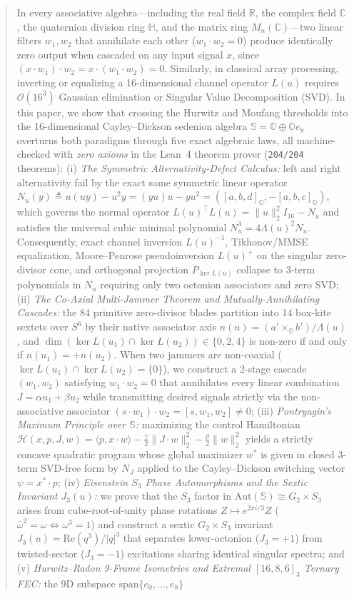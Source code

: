 \documentclass[journal,twoside]{IEEEtran}
\theoremstyle{definition}
\theoremstyle{remark}
\newcommand{\R}{\mathbb{R}}
\newcommand{\C}{\mathbb{C}}
\newcommand{\Ha}{\mathbb{H}}
\newcommand{\Oc}{\mathbb{O}}
\newcommand{\Se}{\mathbb{S}}
\newcommand{\RePart}{\mathrm{Re}}
\newcommand{\Aut}{\mathrm{Aut}}
\begin{document}
\begin{abstract}
In every associative algebra---including the real field $\R$, the complex field $\C$, the quaternion division ring $\Ha$, and the matrix ring $M_n(\C)$---two linear filters $w_1, w_2$ that annihilate each other ($w_1 \cdot w_2 = 0$) produce identically zero output when cascaded on any input signal $x$, since $(x \cdot w_1)\cdot w_2 = x \cdot (w_1 \cdot w_2) = 0$. Similarly, in classical array processing, inverting or equalizing a 16-dimensional channel operator $L(u)$ requires $\mathcal{O}(16^3)$ Gaussian elimination or Singular Value Decomposition (SVD). In this paper, we show that crossing the Hurwitz and Moufang thresholds into the 16-dimensional Cayley--Dickson sedenion algebra $\Se = \Oc \oplus \Oc e_8$ overturns both paradigms through five exact algebraic laws, all machine-checked with \emph{zero axioms} in the Lean~4 theorem prover (\texttt{204/204} theorems): (i) \emph{The Symmetric Alternativity-Defect Calculus:} left and right alternativity fail by the exact same symmetric linear operator $N_u(y) \triangleq u(uy) - u^2 y = (yu)u - y u^2 = ([a,b,d]_{\Oc}, -[a,b,c]_{\Oc})$, which governs the normal operator $L(u)^\top L(u) = \|u\|_2^2 I_{16} - N_u$ and satisfies the universal cubic minimal polynomial $N_u^3 = 4\Lambda(u)^2 N_u$. Consequently, exact channel inversion $L(u)^{-1}$, Tikhonov/MMSE equalization, Moore--Penrose pseudoinversion $L(u)^+$ on the singular zero-divisor cone, and orthogonal projection $P_{\ker L(u)}$ collapse to 3-term polynomials in $N_u$ requiring only two octonion associators and zero SVD; (ii) \emph{The Co-Axial Multi-Jammer Theorem and Mutually-Annihilating Cascades:} the 84 primitive zero-divisor blades partition into 14 box-kite sextets over $S^6$ by their native associator axis $n(u) = (a'\times_{\Oc} b')/\Lambda(u)$, and $\dim(\ker L(u_1)\cap \ker L(u_2)) \in \{0, 2, 4\}$ is non-zero if and only if $n(u_1) = +n(u_2)$. When two jammers are non-coaxial ($\ker L(u_1)\cap \ker L(u_2) = \{0\}$), we construct a 2-stage cascade $(w_1, w_2)$ satisfying $w_1 \cdot w_2 = 0$ that annihilates every linear combination $J = \alpha u_1 + \beta u_2$ while transmitting desired signals strictly via the non-associative associator $(s\cdot w_1)\cdot w_2 = [s, w_1, w_2] \neq 0$; (iii) \emph{Pontryagin's Maximum Principle over $\Se$:} maximizing the control Hamiltonian $\mathcal{H}(x, p, J, w) = \langle p, x\cdot w\rangle - \frac{\gamma}{2}\|J\cdot w\|_2^2 - \frac{\rho}{2}\|w\|_2^2$ yields a strictly concave quadratic program whose global maximizer $w^*$ is given in closed 3-term SVD-free form by $N_J$ applied to the Cayley--Dickson switching vector $\psi = x^*\cdot p$; (iv) \emph{Eisenstein $S_3$ Phase Automorphisms and the Sextic Invariant $J_3(u)$:} we prove that the $S_3$ factor in $\Aut(\Se) \cong G_2 \times S_3$ arises from cube-root-of-unity phase rotations $Z \mapsto e^{2\pi i/3}Z$ ($\bar{\omega}^2 = \omega \iff \omega^3 = 1$) and construct a sextic $G_2\times S_3$ invariant $J_3(u) = \RePart(q^3)/|q|^3$ that separates lower-octonion ($J_3 = +1$) from twisted-sector ($J_3 = -1$) excitations sharing identical singular spectra; and (v) \emph{Hurwitz--Radon 9-Frame Isometries and Extremal $[16, 8, 6]_3$ Ternary FEC:} the 9D subspace $\mathrm{span}\{e_0, \dots, e_8\}$ 
\end{abstract}
\end{document}
